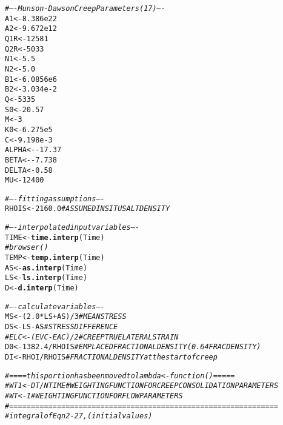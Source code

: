 \documentclass{article}\usepackage[]{graphicx}\usepackage[]{color}
\makeatletter
\newcommand{\hlnum}[1]{\textcolor[rgb]{0.686,0.059,0.569}{#1}}%
\newcommand{\hlcom}[1]{\textcolor[rgb]{0.678,0.584,0.686}{\textit{#1}}}%
\newcommand{\hlopt}[1]{\textcolor[rgb]{0,0,0}{#1}}%
\newcommand{\hlstd}[1]{\textcolor[rgb]{0.345,0.345,0.345}{#1}}%
\newcommand{\hlkwb}[1]{\textcolor[rgb]{0.69,0.353,0.396}{#1}}%
\newcommand{\hlkwd}[1]{\textcolor[rgb]{0.737,0.353,0.396}{\textbf{#1}}}%
\newenvironment{kframe}{%
 \def\at@end@of@kframe{}%
 \ifinner\ifhmode%
  \def\at@end@of@kframe{\end{minipage}}%
  \begin{minipage}{\columnwidth}%
 \fi\fi%
 \def\FrameCommand##1{\hskip\@totalleftmargin \hskip-\fboxsep
 \colorbox{shadecolor}{##1}\hskip-\fboxsep
     \hskip-\linewidth \hskip-\@totalleftmargin \hskip\columnwidth}%
 \MakeFramed {\advance\hsize-\width
   \@totalleftmargin\z@ \linewidth\hsize
   \@setminipage}}%
 {\par\unskip\endMakeFramed%
 \at@end@of@kframe}
\newenvironment{knitrout}{}{} %
\makeatother
\begin{document}
\begin{knitrout}
\begin{kframe}
\begin{alltt}
    \hlcom{# ---- Munson-Dawson Creep Parameters (17) ----}
    \hlstd{A1}          \hlkwb{<-} \hlnum{8.386e22}
    \hlstd{A2}          \hlkwb{<-} \hlnum{9.672e12}
    \hlstd{Q1R}         \hlkwb{<-} \hlnum{12581}
    \hlstd{Q2R}         \hlkwb{<-} \hlnum{5033}
    \hlstd{N1}          \hlkwb{<-} \hlnum{5.5}
    \hlstd{N2}          \hlkwb{<-} \hlnum{5.0}
    \hlstd{B1}          \hlkwb{<-} \hlnum{6.0856e6}
    \hlstd{B2}          \hlkwb{<-} \hlnum{3.034e-2}
    \hlstd{Q}           \hlkwb{<-} \hlnum{5335}
    \hlstd{S0}          \hlkwb{<-} \hlnum{20.57}
    \hlstd{M}           \hlkwb{<-} \hlnum{3}
    \hlstd{K0}          \hlkwb{<-} \hlnum{6.275e5}
    \hlstd{C}           \hlkwb{<-} \hlnum{9.198e-3}
    \hlstd{ALPHA} \hlkwb{<-} \hlopt{-}\hlnum{17.37}
    \hlstd{BETA}        \hlkwb{<-} \hlopt{-}\hlnum{7.738}
    \hlstd{DELTA} \hlkwb{<-} \hlnum{0.58}
    \hlstd{MU}          \hlkwb{<-} \hlnum{12400}

    \hlcom{# ---- fitting assumptions ----}
    \hlstd{RHOIS} \hlkwb{<-} \hlnum{2160.0}  \hlcom{# ASSUMED IN SITU SALT DENSITY}

    \hlcom{# ---- interpolated input variables ----}
    \hlstd{TIME} \hlkwb{<-} \hlkwd{time.interp}\hlstd{(Time)}
    \hlcom{# browser()}
    \hlstd{TEMP} \hlkwb{<-} \hlkwd{temp.interp}\hlstd{(Time)}
    \hlstd{AS}   \hlkwb{<-} \hlkwd{as.interp}\hlstd{(Time)}
    \hlstd{LS}   \hlkwb{<-} \hlkwd{ls.interp}\hlstd{(Time)}
    \hlstd{D}    \hlkwb{<-} \hlkwd{d.interp}\hlstd{(Time)}

    \hlcom{# ---- calculate variables ----}
    \hlstd{MS}  \hlkwb{<-} \hlstd{(}\hlnum{2.0} \hlopt{*} \hlstd{LS} \hlopt{+} \hlstd{AS)} \hlopt{/} \hlnum{3}  \hlcom{# MEAN STRESS}
    \hlstd{DS}  \hlkwb{<-} \hlstd{LS} \hlopt{-} \hlstd{AS}                                    \hlcom{# STRESS DIFFERENCE}
    \hlcom{#   ELC	<- (EVC - EAC) / 2		  # CREEP TRUE LATERAL STRAIN}
    \hlstd{D0}  \hlkwb{<-} \hlnum{1382.4} \hlopt{/} \hlstd{RHOIS}                         \hlcom{# EMPLACED FRACTIONAL DENSITY (0.64 FRAC DENSITY)}
    \hlstd{DI}  \hlkwb{<-} \hlstd{RHOI} \hlopt{/} \hlstd{RHOIS}                     \hlcom{# FRACTIONAL DENSITY at the start of creep}

    \hlcom{# ==== this portion has been moved to lambda <- function() =====}
    \hlcom{#WT1 <- DT / NTIME	  # WEIGHTING FUNCTION FOR CREEP CONSOLIDATION PARAMETERS}
    \hlcom{#WT 	<- 1					  # WEIGHTING FUNCTION FOR FLOW PARAMETERS}
    \hlcom{# ==============================================================}
    \hlcom{# integral of Eqn 2-27, (initial values)}


\end{alltt}
\end{kframe}
\end{knitrout}
\end{document}
